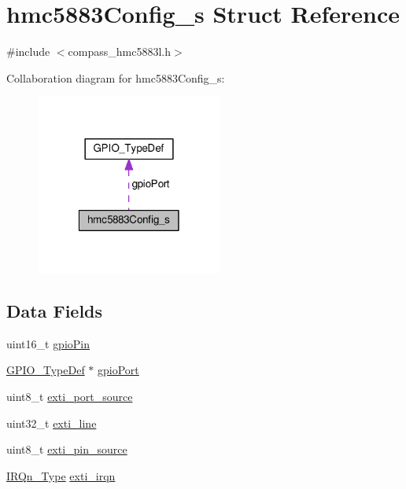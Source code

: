 \hypertarget{structhmc5883Config__s}{\section{hmc5883\+Config\+\_\+s Struct Reference}
\label{structhmc5883Config__s}
}


{\ttfamily \#include $<$compass\+\_\+hmc5883l.\+h$>$}



Collaboration diagram for hmc5883\+Config\+\_\+s\+:\nopagebreak
\begin{figure}[H]
\begin{center}
\leavevmode
\includegraphics[width=174pt]{structhmc5883Config__s__coll__graph}
\end{center}
\end{figure}
\subsection*{Data Fields}
\begin{DoxyCompactItemize}
\item 
uint16\+\_\+t \hyperlink{structhmc5883Config__s_ab2726b794b1d1f0d2506a270af213c02}{gpio\+Pin}
\item 
\hyperlink{structGPIO__TypeDef}{G\+P\+I\+O\+\_\+\+Type\+Def} $\ast$ \hyperlink{structhmc5883Config__s_a9630b820c20ba30ac77ee31227635149}{gpio\+Port}
\item 
uint8\+\_\+t \hyperlink{structhmc5883Config__s_a251852f3515fa2fb77f6c379ecf0ca1b}{exti\+\_\+port\+\_\+source}
\item 
uint32\+\_\+t \hyperlink{structhmc5883Config__s_a61e1427c9131d4f4da5dd1c3f0280ab1}{exti\+\_\+line}
\item 
uint8\+\_\+t \hyperlink{structhmc5883Config__s_ac8b0608d826044378f51e531343b06ae}{exti\+\_\+pin\+\_\+source}
\item 
\hyperlink{test_2unit_2platform_8h_a7e1129cd8a196f4284d41db3e82ad5c8}{I\+R\+Qn\+\_\+\+Type} \hyperlink{structhmc5883Config__s_a86ed09b58f668af7db00beaf70e2e946}{exti\+\_\+irqn}
\end{DoxyCompactItemize}


